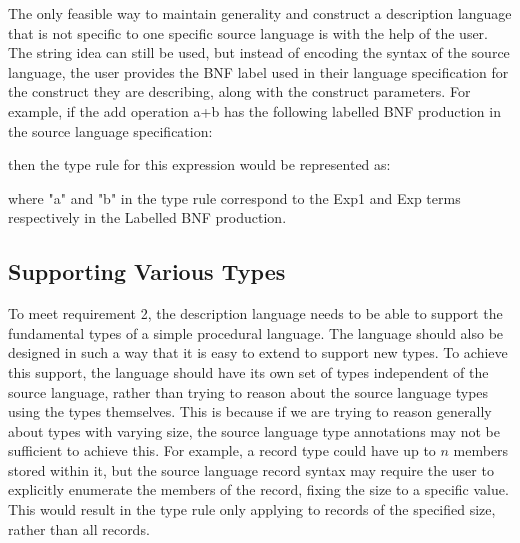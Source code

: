 \documentclass{UoYCSproject}
\begin{document}
The only feasible way to maintain generality and construct a description
language that is not specific to one specific source language is with the
help of the user. The string idea can still be used, but instead of encoding 
the syntax of the source language, the user provides the BNF label used in their
language specification for the construct they are describing, along with the
construct parameters. For example, if the add operation {\ttfamily a+b} has
the following labelled BNF production in the source language specification:

then the type rule for this expression would be represented as:

where {\ttfamily "a"} and {\ttfamily "b"} in the type rule correspond to the 
{\ttfamily Exp1} and {\ttfamily Exp} terms respectively in the Labelled BNF 
production.

\subsection{Supporting Various Types}
To meet requirement 2, the description language needs to be able to support the
fundamental types of a simple procedural language. The language should also be
designed in such a way that it is easy to extend to support new types. To achieve
this support, the language should have its own set of types independent of the
source language, rather than trying to reason about the source language types
using the types themselves. This is because if we are trying to reason generally
about types with varying size, the source language type annotations may not
be sufficient to achieve this. For example, a record type could have up to $n$
members stored within it, but the source language record syntax may require the
user to explicitly enumerate the members of the record, fixing the size to a 
specific value. This would result in the type rule only applying to records of
the specified size, rather than all records.
\end{document}

